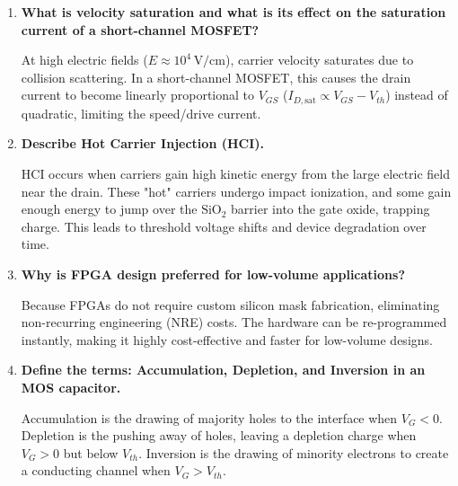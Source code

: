 \documentclass[12pt,a4paper]{article}
\newcommand{\Q}[1]{\textbf{#1}\par\noindent\ignorespaces}
\begin{document}
\begin{tcolorbox}[exambox, title={\textbf{Frequently Asked / Viva Questions}}]
\begin{enumerate}[topsep=0pt, label=\textbf{Q\arabic*.}, itemsep=5pt]
  \item \Q{What is velocity saturation and what is its effect on the saturation current of a short-channel MOSFET?}
    At high electric fields ($E \approx 10^4\,\text{V/cm}$), carrier velocity saturates due to collision scattering. In a short-channel MOSFET, this causes the drain current to become linearly proportional to $V_{GS}$ ($I_{D,\text{sat}} \propto V_{GS} - V_{th}$) instead of quadratic, limiting the speed/drive current.
  \item \Q{Describe Hot Carrier Injection (HCI).}
    HCI occurs when carriers gain high kinetic energy from the large electric field near the drain. These "hot" carriers undergo impact ionization, and some gain enough energy to jump over the $\text{SiO}_2$ barrier into the gate oxide, trapping charge. This leads to threshold voltage shifts and device degradation over time.
  \item \Q{Why is FPGA design preferred for low-volume applications?}
    Because FPGAs do not require custom silicon mask fabrication, eliminating non-recurring engineering (NRE) costs. The hardware can be re-programmed instantly, making it highly cost-effective and faster for low-volume designs.
  \item \Q{Define the terms: Accumulation, Depletion, and Inversion in an MOS capacitor.}
    Accumulation is the drawing of majority holes to the interface when $V_G < 0$. Depletion is the pushing away of holes, leaving a depletion charge when $V_G > 0$ but below $V_{th}$. Inversion is the drawing of minority electrons to create a conducting channel when $V_G > V_{th}$.
\end{enumerate}
\end{tcolorbox}
\end{document}
